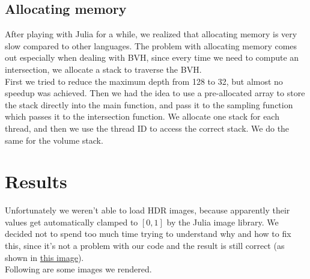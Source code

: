 \documentclass[12pt]{report}
\begin{document}
    \subsection*{Allocating memory}\label{subsec:optimizations-allocating-memory}
    After playing with Julia for a while, we realized that allocating memory is very slow compared to other languages.
    The problem with allocating memory comes out especially when dealing with BVH, since every time we need to compute
    an intersection, we allocate a stack to traverse the BVH\@.\\
    First we tried to reduce the maximum depth from 128 to 32, but almost no speedup was achieved.
    Then we had the idea to use a pre-allocated array to store the stack directly into the main function, and pass it to the
    sampling function which passes it to the intersection function.
    We allocate one stack for each thread, and then we use the thread ID to access the correct stack.
    We do the same for the volume stack.



    \section*{Results}\label{sec:results}
    Unfortunately we weren't able to load HDR images, because apparently their values get automatically clamped to
    $[0,1]$ by the Julia image library.
    We decided not to spend too much time trying to understand why and how to fix this, since it's not a problem with
    our code and the result is still correct (as shown in \hyperref[fig:livingroom1_path]{this image}).\\
    Following are some images we rendered.\\
\end{document}
